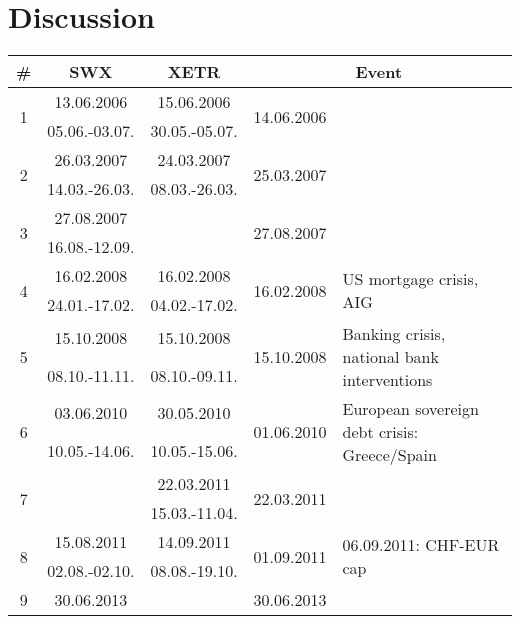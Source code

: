 \documentclass[11pt,twoside,a4paper]{article}
\begin{document}
\section{Discussion}
\begin{table}
\begin{tabular}{c|c|c|c|l}
\# & SWX & XETR & \multicolumn{2}{|c}{Event}\\
\hline
\multirow{2}{*}{1} & 13.06.2006 		& 15.06.2006     & \multirow{2}{*}{14.06.2006} & \multirow{2}{0.33\linewidth}{}\\
							 & 05.06.-03.07.	& 30.05.-05.07. & &\\
\hline
\multirow{2}{*}{2} & 26.03.2007 		& 24.03.2007     & \multirow{2}{*}{25.03.2007} & \multirow{2}{0.33\linewidth}{}\\
							 & 14.03.-26.03.	& 08.03.-26.03. & &\\
\hline
\multirow{2}{*}{3} & 27.08.2007 		&      & \multirow{2}{*}{27.08.2007} & \multirow{2}{0.33\linewidth}{}\\
							 & 16.08.-12.09.	& & &\\
\hline
\multirow{2}{*}{4} & 16.02.2008 		& 16.02.2008     & \multirow{2}{*}{16.02.2008} & \multirow{2}{0.33\linewidth}{US mortgage crisis, AIG}\\
							 & 24.01.-17.02.	& 04.02.-17.02. & &\\
\hline
\multirow{2}{*}{5} & 15.10.2008 		& 15.10.2008     & \multirow{2}{*}{15.10.2008} & \multirow{2}{0.33\linewidth}{Banking crisis, national bank interventions}\\
							 & 08.10.-11.11.	& 08.10.-09.11. & &\\
\hline
\multirow{2}{*}{6} & 03.06.2010 		& 30.05.2010     & \multirow{2}{*}{01.06.2010} & \multirow{2}{0.33\linewidth}{European sovereign debt crisis: Greece/Spain}\\
							 & 10.05.-14.06.	& 10.05.-15.06. & &\\
\hline
\multirow{2}{*}{7} & & 22.03.2011     & \multirow{2}{*}{22.03.2011} & \multirow{2}{0.33\linewidth}{}\\
							 & & 15.03.-11.04. & &\\
\hline
\multirow{2}{*}{8} & 15.08.2011 		& 14.09.2011  & \multirow{2}{*}{01.09.2011} & \multirow{2}{0.33\linewidth}{06.09.2011:  CHF-EUR cap}\\
							 & 02.08.-02.10.	& 08.08.-19.10. & &\\
\hline
\multirow{2}{*}{9} & 30.06.2013 		& & \multirow{2}{*}{30.06.2013} & \multirow{2}{0.33\linewidth}{}\\

\end{tabular}
\end{table}
\end{document}
